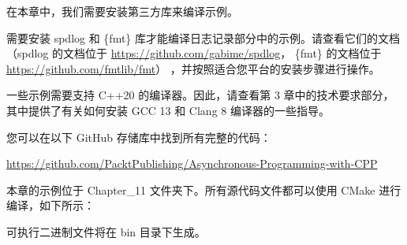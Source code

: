 在本章中，我们需要安装第三方库来编译示例。

需要安装 spdlog 和 \{fmt\} 库才能编译日志记录部分中的示例。请查看它们的文档（spdlog 的文档位于 \url{https://github.com/gabime/spdlog}， \{fmt\} 的文档位于 \url{https://github.com/fmtlib/fmt}） ，并按照适合您平台的安装步骤进行操作。

一些示例需要支持 C++20 的编译器。因此，请查看第 3 章中的技术要求部分，其中提供了有关如何安装 GCC 13 和 Clang 8 编译器的一些指导。

您可以在以下 GitHub 存储库中找到所有完整的代码：

\url{https://github.com/PacktPublishing/Asynchronous-Programming-with-CPP}

本章的示例位于 Chapter\_11 文件夹下。所有源代码文件都可以使用 CMake 进行编译，如下所示：


可执行二进制文件将在 bin 目录下生成。